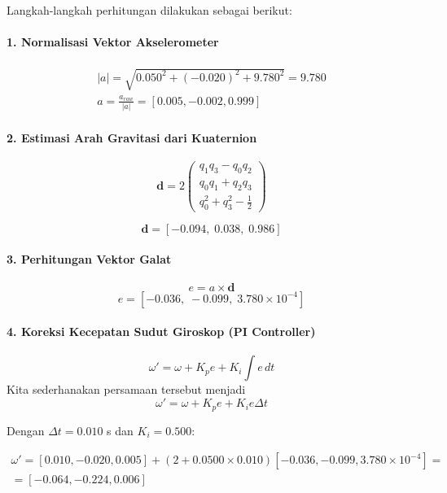 Langkah-langkah perhitungan dilakukan sebagai berikut:

\paragraph{1. Normalisasi Vektor Akselerometer}
{\setlength{\abovedisplayskip}{8pt}%
	\setlength{\belowdisplayskip}{8pt}%
	\[
\begin{split}
	|a| = \sqrt{0.050^2 + (-0.020)^2 + 9.780^2} = 9.780 \\
	a = \frac{a_{raw}}{|a|} = [0.005, -0.002, 0.999]
\end{split}
	\]}
\paragraph{2. Estimasi Arah Gravitasi dari Kuaternion}
{\setlength{\abovedisplayskip}{8pt}%
	\setlength{\belowdisplayskip}{8pt}%
\[
\mathbf{d} = 2
\begin{pmatrix}
	q_1 q_3 - q_0 q_2 \\
	q_0 q_1 + q_2 q_3 \\
	q_0^2 + q_3^2 - \tfrac{1}{2}
\end{pmatrix}
\]}

{\setlength{\abovedisplayskip}{8pt}%
	\setlength{\belowdisplayskip}{8pt}%
\[
\mathbf{d} = [-0.094,\; 0.038,\; 0.986]
\]}
\paragraph{3. Perhitungan Vektor Galat}

{\setlength{\abovedisplayskip}{8pt}%
	\setlength{\belowdisplayskip}{8pt}%
	\[
		e = a \times \mathbf{d}
	\]}
{\setlength{\abovedisplayskip}{8pt}%
	\setlength{\belowdisplayskip}{8pt}%
	\[
	e = [-0.036,\; -0.099,\; 3.780\times10^{-4}]
	\]}

\paragraph{4. Koreksi Kecepatan Sudut Giroskop (PI Controller)}

{\setlength{\abovedisplayskip}{8pt}%
	\setlength{\belowdisplayskip}{8pt}%
	\[
		\omega' = \omega + K_p e + K_i \int e\,dt
	\]}
Kita sederhanakan persamaan tersebut menjadi
{\setlength{\abovedisplayskip}{8pt}%
	\setlength{\belowdisplayskip}{8pt}%
	\[
		\omega' = \omega + K_p e + K_i e \Delta t
	\]}


Dengan $\Delta t = 0.010$ s dan $K_i = 0.500$:

{\setlength{\abovedisplayskip}{8pt}%
	\setlength{\belowdisplayskip}{8pt}%
	\[
		\begin{split}
	\omega' = [0.010, -0.020, 0.005] + (2+ 0.0500 \times 0.010)[-0.036, -0.099, 3.780\times10^{-4}] = \\
	= [-0.064, -0.224, 0.006]
\end{split}
	\]}

